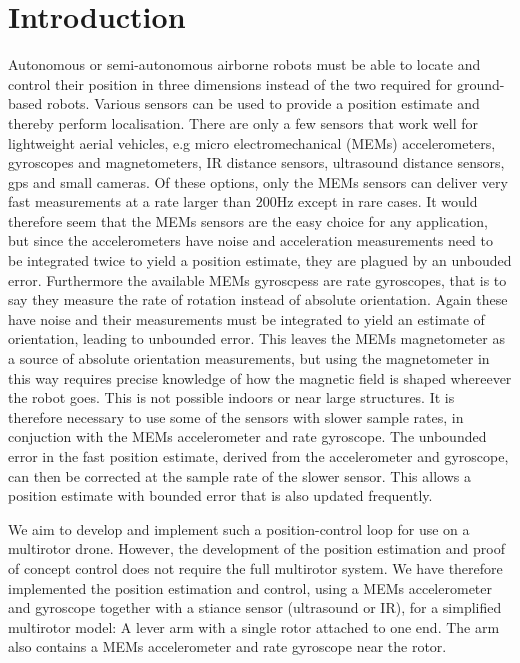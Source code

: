 \section{Introduction}
Autonomous or semi-autonomous airborne robots must be able to locate and control their position in three dimensions instead of
the two required for ground-based robots. Various sensors can be used to provide a position estimate and thereby perform localisation.
There are only a few sensors that work well for lightweight aerial vehicles, e.g micro electromechanical (MEMs) accelerometers, 
gyroscopes and magnetometers, IR distance sensors, ultrasound distance sensors, gps and small cameras. Of these options, only the MEMs
sensors can deliver very fast measurements at a rate larger than 200Hz except in rare cases. It would therefore seem that the MEMs
sensors are the easy choice for any application, but since the accelerometers have noise and acceleration measurements need to be 
integrated twice to yield a position estimate, they are plagued by an unbouded error. Furthermore the available MEMs gyroscpess are rate 
gyroscopes, that is to say they measure the rate of rotation instead of absolute orientation. Again these have noise and their measurements
must be integrated to yield an estimate of orientation, leading to unbounded error. This leaves the MEMs magnetometer as a source of
absolute orientation measurements, but using the magnetometer in this way requires precise knowledge of how the magnetic field is 
shaped whereever the robot goes. This is not possible indoors or near large structures.
It is therefore necessary to use some of the sensors with slower sample rates, in conjuction with
the MEMs accelerometer and rate gyroscope. The unbounded error in the fast position estimate, derived from the accelerometer and gyroscope,
can then be corrected at the sample rate of the slower sensor. This allows a position estimate with bounded error that is also updated
frequently. 

We aim to develop and implement such a position-control loop for use on a multirotor drone. However, the development of the position 
estimation and proof of concept control does not require the full multirotor system. We have therefore implemented the position estimation 
and control, using a MEMs accelerometer and gyroscope together with a stiance sensor (ultrasound or IR), for a simplified multirotor model: 
A lever arm with a single rotor attached to one end. The arm also contains a MEMs accelerometer and rate gyroscope near the rotor.

